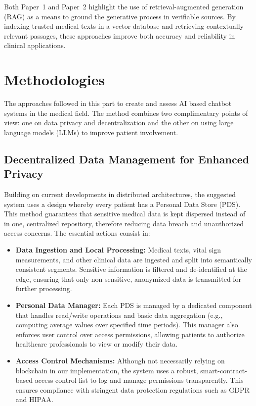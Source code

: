 Both Paper~1 and Paper~2 highlight the use of retrieval-augmented generation (RAG) as a means to ground the generative process in verifiable sources. By indexing trusted medical texts in a vector database and retrieving contextually relevant passages, these approaches improve both accuracy and reliability in clinical applications.

\section{Methodologies}
\label{sec:methodologies}

The approaches followed in this part to create and assess AI based chatbot systems in the medical field.  The method combines two complimentary points of view: one on data privacy and decentralization and the other on using large language models (LLMs) to improve patient involvement.


\subsection{Decentralized Data Management for Enhanced Privacy}
Building on current developments in distributed architectures, the suggested system uses a design whereby every patient has a Personal Data Store (PDS).  This method guarantees that sensitive medical data is kept dispersed instead of in one, centralized repository, therefore reducing data breach and unauthorized access concerns.  The essential actions consist in:
\begin{itemize}[itemsep=2em]
    \item \textbf{Data Ingestion and Local Processing:} Medical texts, vital sign measurements, and other clinical data are ingested and split into semantically consistent segments. Sensitive information is filtered and de-identified at the edge, ensuring that only non-sensitive, anonymized data is transmitted for further processing.
    \item \textbf{Personal Data Manager:} Each PDS is managed by a dedicated component that handles read/write operations and basic data aggregation (e.g., computing average values over specified time periods). This manager also enforces user control over access permissions, allowing patients to authorize healthcare professionals to view or modify their data.
    \item \textbf{Access Control Mechanisms:} Although not necessarily relying on blockchain in our implementation, the system uses a robust, smart-contract-based access control list to log and manage permissions transparently. This ensures compliance with stringent data protection regulations such as GDPR and HIPAA.
\end{itemize}

